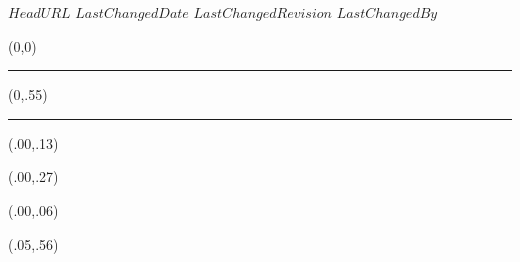\svnidlong
{$HeadURL$}
{$LastChangedDate$}
{$LastChangedRevision$}
{$LastChangedBy$}

\thispagestyle{empty}
\addtocounter{page}{-1}

\begin{textblock}{1}(0,0)
	\noindent\textcolor{redill}{\rule{\paperwidth}{.55\paperheight}}
\end{textblock}


\begin{textblock}{1}(0,.55)
	\noindent\textcolor{black}{\rule{\paperwidth}{.45\paperheight}}
\end{textblock}


\begin{textblock}{1}(.00,.13)
	\begin{center}
	\end{center}
\end{textblock}

\begin{textblock}{1}(.00,.27)
	\begin{center}
	\end{center}
\end{textblock}


\begin{textblock}{1}(.00,.06)
	\begin{center}
			\noindent {\fontsize{20.74}{2}\selectfont
			\bfseries\textcolor{white}{Elisa Antuca\ \ \ Massimo Bertolotti}}
	\end{center}
\end{textblock}



\begin{textblock}{.9}(.05,.56)
	\begin{flushright}
		\noindent {\fontsize{20.74}{2}\selectfont
			\bfseries\textcolor{white}{Manualozzo di Geometria 2}}
	\end{flushright}
\end{textblock}



